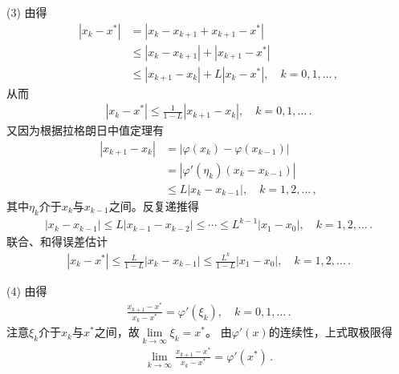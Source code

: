 \begin{prove}
    (3) 由得
    \begin{align}\label{eq:02ex0316}
        |x_k-x^*| & =|x_k-x_{k+1}+x_{k+1}-x^*|\nonumber                \\
                  & \le|x_k-x_{k+1}|+|x_{k+1}-x^*|\nonumber            \\
                  & \le|x_{k+1}-x_k|+L|x_k-x^*|,\quad k=0,1,\ldots\, ,
    \end{align}
    从而
    \begin{align}\label{eq:02ex0317}
        |x_k-x^*|\le\frac{1}{1-L}|x_{k+1}-x_k|,\quad k=0,1,\ldots\, .
    \end{align}
    又因为根据拉格朗日中值定理有
    \begin{align}\label{eq:02ex0318}
        |x_{k+1}-x_k| & =|\varphi(x_k)-\varphi(x_{k-1})|\nonumber \\
                      & =|\varphi'(\eta_k)(x_k-x_{k-1})|\nonumber \\
                      & \le L|x_k-x_{k-1}|,\quad k=1,2,\ldots\, ,
    \end{align}
    其中$\eta_k$介于$x_k$与$x_{k-1}$之间。反复递推得
    \begin{align}\label{eq:02ex0319}
        |x_k-x_{k-1}|\le L |x_{k-1}-x_{k-2}|\le\cdots\le L^{k-1}|x_1-x_0|,\quad k=1,2,\ldots\, .
    \end{align}
    联合、和得误差估计
    \begin{align}\label{eq:02ex0320}
        |x_k-x^*|\le\frac{L}{1-L}|x_k-x_{k-1}|\le\frac{L^k}{1-L}|x_1-x_0|,\quad k=1,2,\ldots\, .
    \end{align}

    (4) 由得
    \begin{align}\label{eq:02ex0321}
        \frac{x_{k+1}-x^*}{x_k-x^*}=\varphi'(\xi_k),\quad k=0,1,\ldots\, .
    \end{align}
    注意$\xi_k$介于$x_k$与$x^*$之间，故$\displaystyle\lim\limits_{k\rightarrow\infty}{\xi_k}=x^*$。
    由$\varphi'(x)$的连续性，上式取极限得
    \begin{align}\label{eq:02ex0322}
        \lim\limits_{k\rightarrow\infty}{\frac{x_{k+1}-x^*}{x_k-x^*}}=\varphi'(x^*)\, .
    \end{align}
\end{prove}

